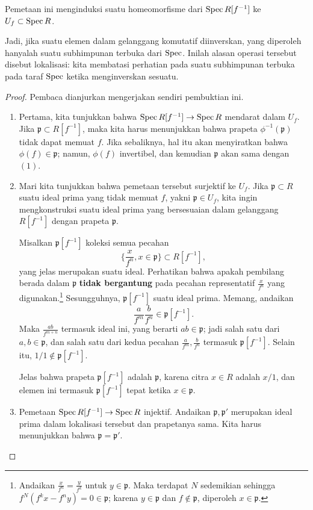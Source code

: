 \begin{proposition} 
Pemetaan ini menginduksi suatu homeomorfisme dari $\operatorname{Spec} R[f^{-1}]$ ke $U_f
\subset \operatorname{Spec}
R$. 
\end{proposition} 
Jadi, jika suatu elemen dalam gelanggang komutatif diinverskan, yang diperoleh hanyalah suatu subhimpunan
terbuka dari $\operatorname{Spec}$. Inilah alasan operasi tersebut disebut lokalisasi:
kita
membatasi perhatian pada
suatu subhimpunan terbuka pada taraf $\operatorname{Spec} $ ketika menginverskan sesuatu.

\begin{proof}
Pembaca dianjurkan mengerjakan sendiri pembuktian ini.

\begin{enumerate}
\item 
Pertama, kita tunjukkan bahwa $\operatorname{Spec} R[f^{-1}] \to \operatorname{Spec} R$ mendarat dalam
$U_f$. Jika
$\mathfrak{p} \subset R[f^{-1}]$, maka kita harus menunjukkan bahwa
prapeta
$\phi^{-1}(\mathfrak{p})$ tidak dapat memuat $f$. Jika sebaliknya, hal itu
akan menyiratkan bahwa
$\phi(f) \in \mathfrak{p}$; namun, $\phi(f)$ invertibel,
dan kemudian
$\mathfrak{p}$ akan sama dengan $(1)$.  
\item Mari kita tunjukkan bahwa pemetaan tersebut surjektif ke $U_f$. Jika
$\mathfrak{p} \subset R$ suatu ideal
prima yang tidak memuat $f$, yakni $\mathfrak{p} \in U_f$, kita ingin
mengkonstruksi suatu
ideal prima yang bersesuaian dalam gelanggang $R[f^{-1}]$ dengan prapeta
$\mathfrak{p}$.

Misalkan $\mathfrak{p}[f^{-1}]$ koleksi semua pecahan
\[ \{\frac{x}{f^n}, x \in \mathfrak{p}\} \subset R[f^{-1}],  \]
yang jelas merupakan suatu ideal. Perhatikan bahwa apakah pembilang berada
dalam
$\mathfrak{p}$ \textbf{tidak bergantung} pada
pecahan representatif $\frac{x}{f^n}$ yang digunakan.\footnote{Andaikan
$\frac{x}{f^n} =
\frac{y}{f^k}$ untuk $y \in \mathfrak{p}$. Maka terdapat $N$ sedemikian
sehingga
$f^N(f^k x - f^n y) = 0 \in \mathfrak{p}$; karena $y \in
\mathfrak{p}$ dan $f
\notin \mathfrak{p}$, diperoleh $x \in \mathfrak{p}$.}
Sesungguhnya, $\mathfrak{p}[f^{-1}]$ suatu ideal prima. Memang,
andaikan
\[  \frac{a}{f^m} \frac{b}{f^n} \in \mathfrak{p}[f^{-1}] .\]
Maka $\frac{ab}{f^{m+n}}$ termasuk ideal ini, yang berarti $ab
\in
\mathfrak{p}$; jadi salah satu dari $a,b \in \mathfrak{p}$, dan salah satu
dari kedua pecahan
$\frac{a}{f^m}, \frac{b}{f^n}$ termasuk
$\mathfrak{p}[f^{-1}]$. Selain itu, $1/1
\notin \mathfrak{p}[f^{-1}]$.

Jelas bahwa prapeta $\mathfrak{p}[f^{-1}]$ adalah
$\mathfrak{p}$,
karena citra $x \in R$ adalah $x/1$, dan elemen ini termasuk
$\mathfrak{p}[f^{-1}]$ tepat ketika $x \in \mathfrak{p}$.
\item Pemetaan $\operatorname{Spec} R[f^{-1}] \to \operatorname{Spec} R$ injektif.
Andaikan
$\mathfrak{p}, \mathfrak{p'}$ merupakan ideal prima dalam
lokalisasi tersebut dan
prapetanya sama.  
Kita harus menunjukkan bahwa $\mathfrak{p} = \mathfrak{p'}$.


\end{enumerate}
\end{proof}
